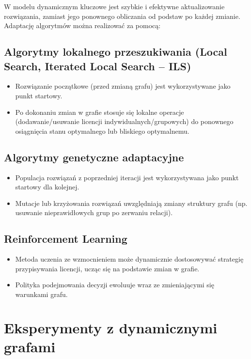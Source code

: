 W modelu dynamicznym kluczowe jest szybkie i efektywne aktualizowanie rozwiązania, zamiast jego ponownego obliczania od podstaw po każdej zmianie. Adaptację algorytmów można realizować za pomocą:

\subsection{Algorytmy lokalnego przeszukiwania (Local Search, Iterated Local Search – ILS)}

\begin{itemize}
    \item Rozwiązanie początkowe (przed zmianą grafu) jest wykorzystywane jako punkt startowy.
    \item Po dokonaniu zmian w grafie stosuje się lokalne operacje (dodawanie/usuwanie licencji indywidualnych/grupowych) do ponownego osiągnięcia stanu optymalnego lub bliskiego optymalnemu.
\end{itemize}

\subsection{Algorytmy genetyczne adaptacyjne}

\begin{itemize}
    \item Populacja rozwiązań z poprzedniej iteracji jest wykorzystywana jako punkt startowy dla kolejnej.
    \item Mutacje lub krzyżowania rozwiązań uwzględniają zmiany struktury grafu (np. usuwanie nieprawidłowych grup po zerwaniu relacji).
\end{itemize}

\subsection{Reinforcement Learning}

\begin{itemize}
    \item Metoda uczenia ze wzmocnieniem może dynamicznie dostosowywać strategię przypisywania licencji, ucząc się na podstawie zmian w grafie.
    \item Polityka podejmowania decyzji ewoluuje wraz ze zmieniającymi się warunkami grafu.
\end{itemize}

\section{Eksperymenty z dynamicznymi grafami}

